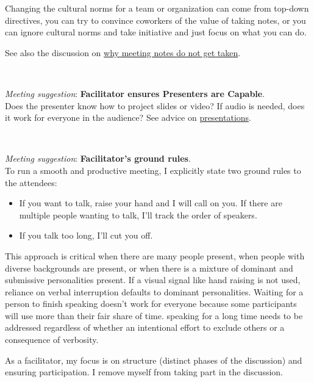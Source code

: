 Changing the cultural norms for a team or organization can come from top-down directives, you can try to convince coworkers of the value of taking notes, or you can ignore cultural norms and take initiative and just focus on what you can do.


See also the discussion on \hyperref[sec:written-comm-does-not-happen]{why meeting notes do not get taken}.

\ \\
\begin{samepage}
\textit{Meeting suggestion}: \textbf{Facilitator ensures Presenters are Capable}.\\
Does the presenter know how to project slides or video? If audio is needed, does it work for everyone in the audience?
See advice on \hyperref[sec:bad-presentations]{presentations}.
\end{samepage}

\ \\
\begin{samepage}
\textit{Meeting suggestion}: \textbf{Facilitator's ground rules}.\\
To run a smooth and productive meeting, I explicitly state two ground rules to the attendees:
\end{samepage}
\begin{itemize}
    \item If you want to talk, raise your hand and I will call on you. If there are multiple people wanting to talk, I'll track the order of speakers.
    \item If you talk too long, I'll cut you off. 
\end{itemize}
This approach is critical when there are many people present, when people with diverse backgrounds are present, or when there is a mixture of dominant and submissive personalities present. 
If a visual signal like hand raising is not used, reliance on verbal interruption defaults to dominant personalities. Waiting for a person to finish speaking doesn't work for everyone because some participants will use more than their fair share of time. speaking for a long time needs to be addressed regardless of whether an intentional effort to exclude others or a consequence of verbosity.

As a facilitator, my focus is on structure (distinct phases of the discussion) and ensuring participation. I remove myself from taking part in the discussion.

